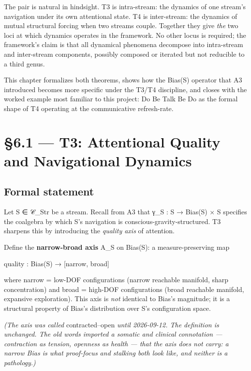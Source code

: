 \documentclass[11pt, openany]{book}
\newcommand{\sectionbreak}{\clearpage}
\begin{document}
The pair is natural in hindsight. T3 is intra-stream: the dynamics of one stream's navigation under its own attentional state. T4 is inter-stream: the dynamics of mutual structural forcing when two streams couple. Together they give \textit{the} two loci at which dynamics operates in the framework. No other locus is required; the framework's claim is that all dynamical phenomena decompose into intra-stream and inter-stream components, possibly composed or iterated but not reducible to a third genus.

This chapter formalizes both theorems, shows how the Bias(S) operator that A3 introduced becomes more specific under the T3/T4 discipline, and closes with the worked example most familiar to this project: Do Be Talk Be Do as the formal shape of T4 operating at the communicative refresh-rate.

\sectionbreak

\section{§6.1 --- T3: Attentional Quality and Navigational Dynamics}

\subsection{Formal statement}

Let S ∈ 𝒞\_\allowbreak{}Str be a stream. Recall from A3 that γ\_\allowbreak{}S : S → Bias(S) × S specifies the coalgebra by which S's navigation is conscious-gravity-structured. T3 sharpens this by introducing the \textit{quality axis} of attention.

Define the \textbf{narrow-broad axis} A\_\allowbreak{}S on Bias(S): a measure-preserving map

\begin{Code}
quality : Bias(S) → [narrow, broad]
\end{Code}

where narrow = low-DOF configurations (narrow reachable manifold, sharp concentration) and broad = high-DOF configurations (broad reachable manifold, expansive exploration). This axis is \textit{not} identical to Bias's magnitude; it is a structural property of Bias's distribution over S's configuration space.

\textit{(The axis was called} contracted–open \textit{until 2026-09-12. The definition is unchanged. The old words imported a somatic and clinical connotation --- contraction as tension, openness as health --- that the axis does not carry: a narrow Bias is what proof-focus and stalking both look like, and neither is a pathology.)}
\end{document}

